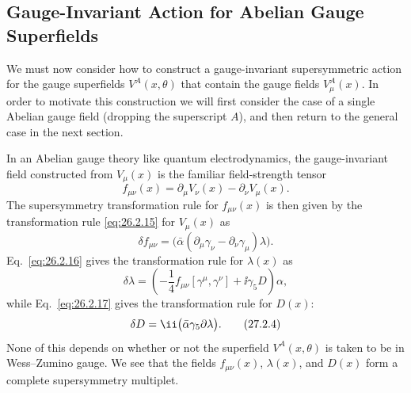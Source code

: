 
\providecommand{\SuperD}{\mathcal{D}}

\subsection{Gauge-Invariant Action for Abelian Gauge Superfields}

We must now consider how to construct a gauge-invariant supersymmetric
action for the gauge superfields \(V^A(x,\theta)\) that contain the gauge
fields \(V_\mu^A(x)\). In order to motivate this construction we will first
consider the case of a single Abelian gauge field (dropping the superscript
\(A\)), and then return to the general case in the next section.

In an Abelian gauge theory like quantum electrodynamics, the gauge-invariant
field constructed from \(V_\mu(x)\) is the familiar field-strength tensor
\begin{equation}
  f_{\mu\nu}(x)
  =\partial_\mu V_\nu(x)-\partial_\nu V_\mu(x).
  \tag{27.2.1}\label{eq:27.2.1}
\end{equation}
The supersymmetry transformation rule for \(f_{\mu\nu}(x)\) is then given
by the transformation rule \eqref{eq:26.2.15} for \(V_\mu(x)\) as
\begin{equation}
  \delta f_{\mu\nu}
  =\bigl(\bar\alpha(\partial_\mu\gamma_\nu
    -\partial_\nu\gamma_\mu)\lambda\bigr).
  \tag{27.2.2}\label{eq:27.2.2}
\end{equation}
Eq.~\eqref{eq:26.2.16} gives the transformation rule for \(\lambda(x)\) as
\begin{equation}
  \delta\lambda
  =\left(-\frac14 f_{\mu\nu}[\gamma^\mu,\gamma^\nu]
    +\ii\gamma_5D\right)\alpha,
  \tag{27.2.3}\label{eq:27.2.3}
\end{equation}
while Eq.~\eqref{eq:26.2.17} gives the transformation rule for \(D(x)\):
\begin{equation}
  \delta D=\ii\bigl(\bar\alpha\gamma_5\sl{\partial}\lambda\bigr).
  \tag{27.2.4}\label{eq:27.2.4}
\end{equation}
None of this depends on whether or not the superfield \(V^A(x,\theta)\) is
taken to be in Wess--Zumino gauge. We see that the fields
\(f_{\mu\nu}(x)\), \(\lambda(x)\), and \(D(x)\) form a complete
supersymmetry multiplet.

